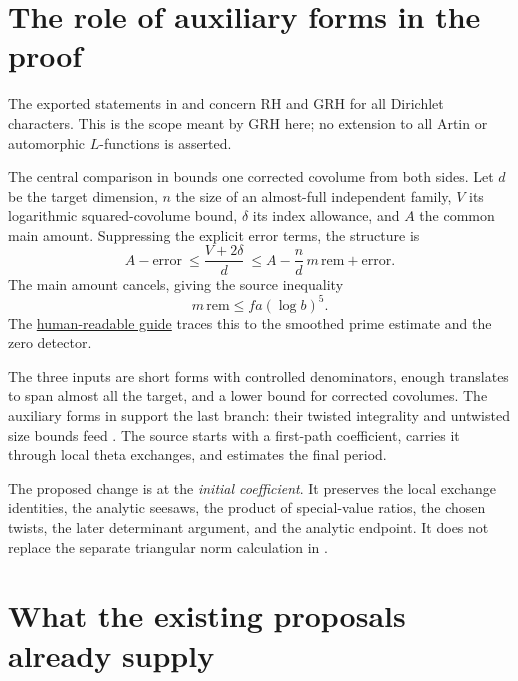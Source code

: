 \section{The role of auxiliary forms in the proof}

The exported statements in  and  concern RH and GRH for all Dirichlet characters. This is the scope meant by GRH here; no extension to all Artin or automorphic $L$-functions is asserted.

The central comparison in  bounds one corrected covolume from both sides. Let $d$ be the target dimension, $n$ the size of an almost-full independent family, $V$ its logarithmic squared-covolume bound, $\delta$ its index allowance, and $A$ the common main amount. Suppressing the explicit error terms, the structure is
\[
 A-\text{error}\ \leq\frac{V+2\delta}{d}
 \ \leq A-\frac nd\,m\,\mathrm{rem}+\text{error}.
\]
The main amount cancels, giving the source inequality
\[
 m\,\mathrm{rem}\leq f a(\log b)^5.
\]
The \href{https://github.com/VladimirReshetnikov/ProveIt/blob/1a59f50680e470fb5269bbe70c06f974c95ad930/Analysis/GeneralizedRiemannHypothesis/docs/guide/theta_lifts_and_dirichlet_zeros.tex}{human-readable guide} traces this to the smoothed prime estimate and the zero detector.

The three inputs are short forms with controlled denominators, enough translates to span almost all the target, and a lower bound for corrected covolumes. The auxiliary forms in  support the last branch: their twisted integrality and untwisted size bounds feed . The source starts with a first-path coefficient, carries it through local theta exchanges, and estimates the final period.

The proposed change is at the \emph{initial coefficient}. It preserves the local exchange identities, the analytic seesaws, the product of special-value ratios, the chosen twists, the later determinant argument, and the analytic endpoint. It does not replace the separate triangular norm calculation in .

\section{What the existing proposals already supply}
\label{sec:novelty}

